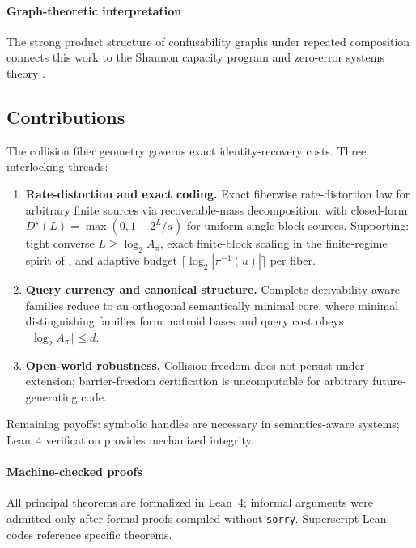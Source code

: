 \paragraph{Graph-theoretic interpretation}
The strong product structure of confusability graphs under repeated composition connects this work to the Shannon capacity program \cite{simonyi1995graph, alon1996source, haemers1978upper, zuiddam2019asymptotic} and zero-error systems theory \cite{witsenhausen1976zero}.

\subsection{Contributions}

The collision fiber geometry governs exact identity-recovery costs. Three interlocking threads:

\begin{enumerate}
\item \textbf{Rate-distortion and exact coding.} Exact fiberwise rate-distortion law for arbitrary finite sources via recoverable-mass decomposition, with closed-form $D^\star(L)=\max(0,1-2^L/a)$ for uniform single-block sources. Supporting: tight converse $L \ge \log_2 A_{\pi}$, exact finite-block scaling in the finite-regime spirit of \cite{polyanskiy2010channel}, and adaptive budget $\lceil \log_2 |\pi^{-1}(u)|\rceil$ per fiber.
\item \textbf{Query currency and canonical structure.} Complete derivability-aware families reduce to an orthogonal semantically minimal core, where minimal distinguishing families form matroid bases and query cost obeys $\lceil \log_2 A_{\pi}\rceil \le d$.
\item \textbf{Open-world robustness.} Collision-freedom does not persist under extension; barrier-freedom certification is uncomputable for arbitrary future-generating code.
\end{enumerate}

Remaining payoffs: symbolic handles are necessary in semantics-aware systems; Lean~4 verification provides mechanized integrity.

\paragraph{Machine-checked proofs}
All principal theorems are formalized in Lean~4; informal arguments were admitted only after formal proofs compiled without \texttt{sorry}. Superscript Lean codes reference specific theorems. 

